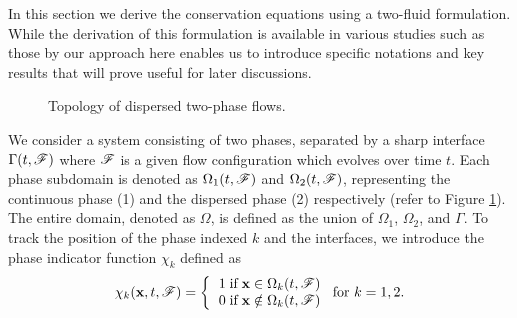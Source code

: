 In this section we derive the conservation equations using a two-fluid formulation.
While the derivation of this formulation is available in various studies such as those by \citet{kataoka1986local,lhuillier2010multiphase,ishii2010thermo,morel2015mathematical,bothe2022sharp} our approach here enables us to introduce specific notations and key results that will prove useful for later discussions. %
\begin{figure}[h!]
    \centering
    \caption{Topology of dispersed two-phase flows.}%
    \label{fig:Scheme}
\end{figure}

We consider a system consisting of two phases, separated by a sharp interface $\Gamma(t,\mathscr{F})$ where $\mathscr{F}$ is a given flow configuration which evolves over time $t$. 
Each phase subdomain is denoted as $\Omega_1(t,\mathscr{F})$ and $\Omega_2(t,\mathscr{F})$, representing the continuous phase (1) and the dispersed phase (2) respectively (refer to Figure \ref{fig:Scheme}).
The entire domain, denoted as $\Omega$, is defined as the union of $\Omega_1$, $\Omega_2$, and $\Gamma$.
To track the position of the phase indexed $k$ and the interfaces, we introduce the phase indicator function $\chi _k$ defined as
\begin{align}
    \chi_k(\textbf{x},t,\FF) =  \left\{
      \begin{tabular}{cc}
        $1 \;\text{if} \;\textbf{x} \in \Omega_k(t,\FF)$\\
        $0 \;\text{if} \;\textbf{x} \notin \Omega_k(t,\FF)$
      \end{tabular}
      \right.
      \text{for $k = 1,2$}.
      \label{eq:PIF}
\end{align}


